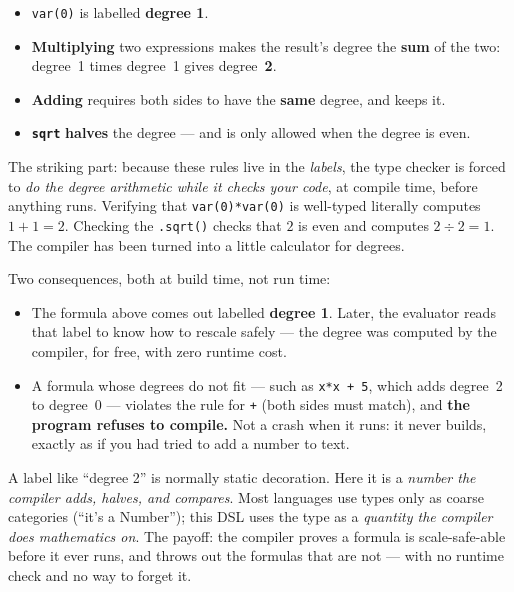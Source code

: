 \documentclass[11pt]{article}
\newcommand{\code}[1]{\texttt{#1}}
\begin{document}
\begin{itemize}[leftmargin=1.4em]
  \item \code{var(0)} is labelled \textbf{degree 1}.
  \item \textbf{Multiplying} two expressions makes the result's degree the
  \textbf{sum} of the two: degree~1 times degree~1 gives degree~\textbf{2}.
  \item \textbf{Adding} requires both sides to have the \textbf{same} degree, and
  keeps it.
  \item \textbf{\code{sqrt}} \textbf{halves} the degree --- and is only allowed
  when the degree is even.
\end{itemize}

The striking part: because these rules live in the \emph{labels}, the type
checker is forced to \emph{do the degree arithmetic while it checks your code},
at compile time, before anything runs. Verifying that \code{var(0)*var(0)} is
well-typed literally computes $1+1=2$. Checking the \code{.sqrt()} checks that
$2$ is even and computes $2 \div 2 = 1$. The compiler has been turned into a
little calculator for degrees.

Two consequences, both at build time, not run time:

\begin{itemize}[leftmargin=1.4em]
  \item The formula above comes out labelled \textbf{degree 1}. Later, the
  evaluator reads that label to know how to rescale safely --- the degree was
  computed by the compiler, for free, with zero runtime cost.
  \item A formula whose degrees do not fit --- such as \code{x*x + 5}, which adds
  degree~2 to degree~0 --- violates the rule for \code{+} (both sides must
  match), and \textbf{the program refuses to compile.} Not a crash when it runs:
  it never builds, exactly as if you had tried to add a number to text.
\end{itemize}

\begin{keyidea}
A label like ``degree 2'' is normally static decoration. Here it is a
\emph{number the compiler adds, halves, and compares}. Most languages use types
only as coarse categories (``it's a Number''); this DSL uses the type as a
\emph{quantity the compiler does mathematics on}. The payoff: the compiler
proves a formula is scale-safe-able before it ever runs, and throws out the
formulas that are not --- with no runtime check and no way to forget it.
\end{keyidea}
\end{document}
